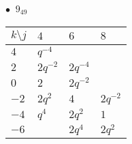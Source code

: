 %
\begin{minipage}{\linewidth}
$\bullet\ $ $9_{49}$ \vspace{0.5em} \\
\begin{tabular}{l|lll}
$k \setminus j$ & $4$ & $6$ & $8$ \\
\hline
$4$ & $q^{-4}$ &  &  \\
$2$ & $2q^{-2}$ & $2q^{-4}$ &  \\
$0$ & $2$ & $2q^{-2}$ &  \\
$-2$ & $2q^{2}$ & $4$ & $2q^{-2}$ \\
$-4$ & $q^{4}$ & $2q^{2}$ & $1$ \\
$-6$ &  & $2q^{4}$ & $2q^{2}$ \\
\end{tabular}
\vspace{2em}
\end{minipage}
%